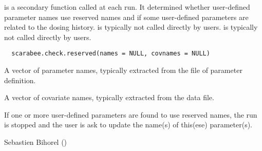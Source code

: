 %
\begin{Description}\relax
{} is a secondary function called at each 
 run. It determined whether user-defined parameter names use 
reserved names and if some user-defined parameters are related to the dosing
history.  is typically not called directly by
users.  is typically not called directly by
users.
\end{Description}
%
\begin{Usage}
\begin{verbatim}
  scarabee.check.reserved(names = NULL, covnames = NULL)
\end{verbatim}
\end{Usage}
%
\begin{Arguments}
\begin{ldescription}
\item[\code{names}] A vector of parameter names, typically extracted from the file
of parameter definition.
\item[\code{covnames}] A vector of covariate names, typically extracted from the 
data file.
\end{ldescription}
\end{Arguments}
%
\begin{Details}\relax
If one or more user-defined parameters are found to use reserved names, the 
run is stopped and the user is ask to update the name(s) of this(ese) 
parameter(s).
\end{Details}
%
\begin{Author}\relax
Sebastien Bihorel ()
\end{Author}
